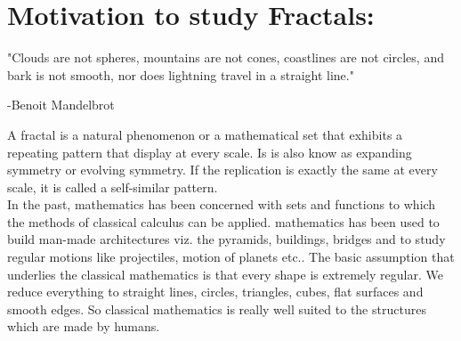 \documentclass[14pt]{extarticle}
\begin{document}
\newpage

\tableofcontents

\newpage 

\section*{\LARGE Motivation to study Fractals:}
"Clouds are not spheres, mountains are not cones, coastlines are not circles, and bark is not smooth, nor does lightning travel in a straight line."\\
\begin{flushright}
-Benoit Mandelbrot
\end{flushright}

A fractal is a natural phenomenon or a mathematical set that exhibits a repeating pattern that display at every scale. Is is also know as expanding symmetry or evolving symmetry. If the replication is exactly the same at every scale, it is called a self-similar pattern.\\
In the past, mathematics has been concerned with sets and functions to which the methods of classical calculus can be applied. mathematics has been used to build man-made architectures viz. the pyramids, buildings, bridges and to study regular motions like projectiles, motion of planets etc.. The basic assumption that underlies the classical mathematics is that every shape is extremely regular. We reduce everything to straight lines, circles, triangles, cubes, flat surfaces and smooth edges. So classical mathematics is really well suited to the structures which are made by humans.

\newpage 
\end{document}

